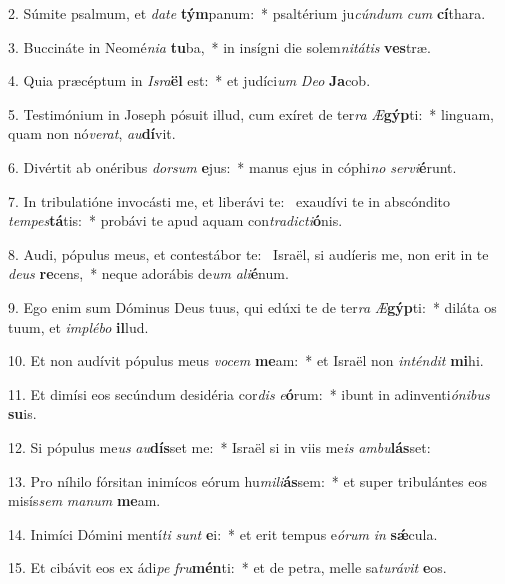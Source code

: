 2. Súmite psalmum, et \textit{da}\textit{te} \textbf{tým}panum:~*  psaltérium ju\textit{cún}\textit{dum} \textit{cum} \textbf{cí}thara.\

3. Buccináte in Neomé\textit{ni}\textit{a} \textbf{tu}ba,~*  in insígni die solem\textit{ni}\textit{tá}\textit{tis} \textbf{ves}træ.\

4. Quia præcéptum in \textit{Is}\textit{ra}\textbf{ël} est:~*  et judíci\textit{um} \textit{De}\textit{o} \textbf{Ja}cob.\

5. Testimónium in Joseph pósuit illud, cum exíret de ter\textit{ra} \textit{Æ}\textbf{gýp}ti:~*  linguam, quam non nó\textit{ve}\textit{rat}, \textit{au}\textbf{dí}vit.\

6. Divértit ab onéribus \textit{dor}\textit{sum} \textbf{e}jus:~*  manus ejus in cóphi\textit{no} \textit{ser}\textit{vi}\textbf{é}runt.\

7. In tribulatióne invocásti me, et liberávi te: \dag\  exaudívi te in abscóndito \textit{tem}\textit{pes}\textbf{tá}tis:~*  probávi te apud aquam con\textit{tra}\textit{dic}\textit{ti}\textbf{ó}nis.\

8. Audi, pópulus meus, et contestábor te: \dag\  Israël, si audíeris me, non erit in te \textit{de}\textit{us} \textbf{re}cens,~*  neque adorábis de\textit{um} \textit{a}\textit{li}\textbf{é}num.\

9. Ego enim sum Dóminus Deus tuus, qui edúxi te de ter\textit{ra} \textit{Æ}\textbf{gýp}ti:~*  diláta os tuum, et \textit{im}\textit{plé}\textit{bo} \textbf{il}lud.\

10. Et non audívit pópulus meus \textit{vo}\textit{cem} \textbf{me}am:~*  et Israël non \textit{in}\textit{tén}\textit{dit} \textbf{mi}hi.\

11. Et dimísi eos secúndum desidéria cor\textit{dis} \textit{e}\textbf{ó}rum:~*  ibunt in adinventi\textit{ó}\textit{ni}\textit{bus} \textbf{su}is.\

12. Si pópulus me\textit{us} \textit{au}\textbf{dís}set me:~*  Israël si in viis me\textit{is} \textit{am}\textit{bu}\textbf{lás}set:\

13. Pro níhilo fórsitan inimícos eórum hu\textit{mi}\textit{li}\textbf{ás}sem:~*  et super tribulántes eos misís\textit{sem} \textit{ma}\textit{num} \textbf{me}am.\

14. Inimíci Dómini mentí\textit{ti} \textit{sunt} \textbf{e}i:~*  et erit tempus e\textit{ó}\textit{rum} \textit{in} \textbf{sǽ}cula.\

15. Et cibávit eos ex ádi\textit{pe} \textit{fru}\textbf{mén}ti:~*  et de petra, melle sa\textit{tu}\textit{rá}\textit{vit} \textbf{e}os.\

